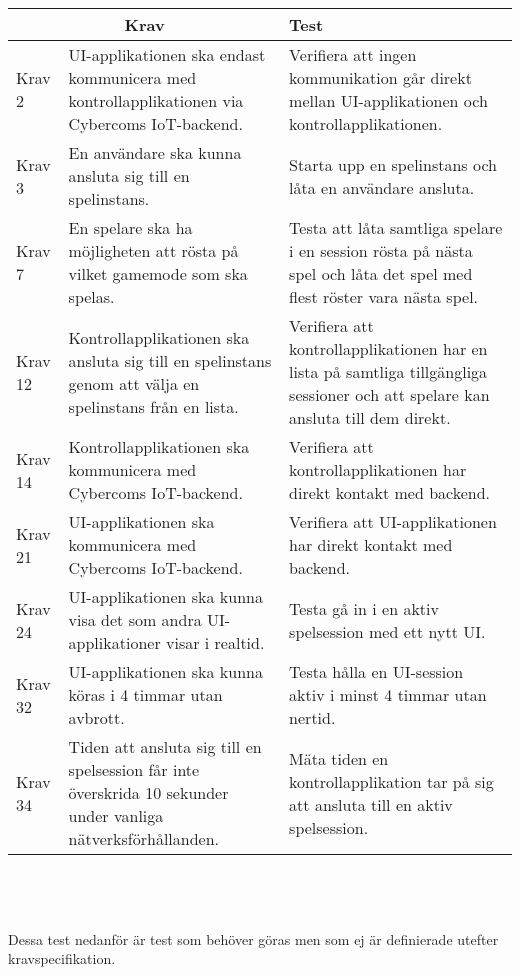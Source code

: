 	\begin{tabular}{| p{1.5cm} | p{6cm} | p{8cm}|}

  \hline
    \multicolumn{2}{|c|}{Krav}&{Test}\\
    \hline
		Krav 2&UI-applikationen ska endast kommunicera med kontrollapplikationen via Cybercoms IoT-backend.&Verifiera att ingen kommunikation går direkt mellan UI-applikationen och kontrollapplikationen.\\
		\hline
		Krav 3& En användare ska kunna ansluta sig till en spelinstans. &Starta upp en spelinstans och låta en användare ansluta. \\
		\hline
		Krav 7& En spelare ska ha möjligheten att rösta på vilket gamemode som ska spelas. & Testa att låta samtliga spelare i en session rösta på nästa spel och låta det spel med flest röster vara nästa spel.\\
		\hline
		Krav 12& Kontrollapplikationen ska ansluta sig till en spelinstans genom att välja en spelinstans från en lista. & Verifiera att kontrollapplikationen har en lista på samtliga tillgängliga sessioner och att spelare kan ansluta till dem direkt. \\
		\hline
		Krav 14& Kontrollapplikationen ska kommunicera med Cybercoms IoT-backend. & Verifiera att kontrollapplikationen har direkt kontakt med backend. \\
		\hline
		Krav 21& UI-applikationen ska kommunicera med Cybercoms IoT-backend. & Verifiera att UI-applikationen har direkt kontakt med backend. \\
		\hline
		Krav 24& UI-applikationen ska kunna visa det som andra UI-applikationer visar i realtid. & Testa gå in i en aktiv spelsession med ett nytt UI. \\
		\hline
		Krav 32& UI-applikationen ska kunna köras i 4 timmar utan avbrott. & Testa hålla en UI-session aktiv i minst 4 timmar utan nertid. \\
		\hline
		Krav 34& Tiden att ansluta sig till en spelsession får inte överskrida 10 sekunder under vanliga nätverksförhållanden. & Mäta tiden en kontrollapplikation tar på sig att ansluta till en aktiv spelsession. \\
		\hline


  \end{tabular}
    \\  \\ \\
  Dessa test nedanför är test som behöver göras men som ej är definierade utefter kravspecifikation.
  \\

